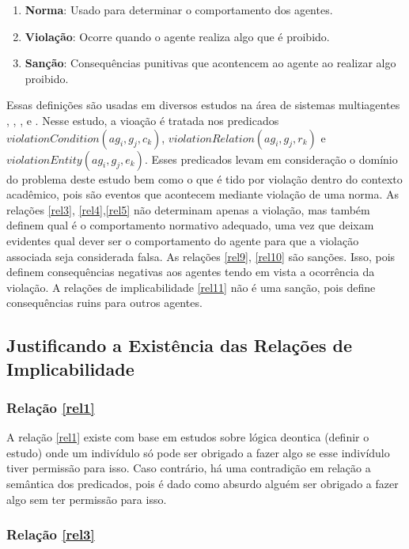 \documentclass[12pt]{article}
\begin{document}
\begin{enumerate}
	\item \textbf{Norma}: Usado para determinar o comportamento dos agentes.
	\item \textbf{Violação}: Ocorre quando o agente realiza algo que é proibido.
	\item \textbf{Sanção}: Consequências punitivas que acontencem ao agente ao realizar algo proibido.	
\end{enumerate}

Essas definições são usadas em diversos estudos na área de sistemas multiagentes \cite{dastaniNormativeMultiAgentProgram}, \cite{multiagentsystem}, \cite{violationcamille}, \cite{amodelmultiagentsystemdynamicrelationship} e \cite{ontologynormative}. Nesse estudo, a vioação é tratada nos predicados $violationCondition(ag_i,g_j,c_k)$, $violationRelation(ag_i,g_j,r_k)$ e $violationEntity(ag_i,g_j,e_k)$. Esses predicados levam em consideração o domínio do problema deste estudo bem como o que é tido por violação dentro do contexto acadêmico, pois são eventos que acontecem mediante violação de uma norma. As relações \ref{rel3}, \ref{rel4},\ref{rel5} não determinam apenas a violação, mas também definem qual é o comportamento normativo adequado, uma vez que deixam evidentes qual dever ser o comportamento do agente para que a violação associada seja considerada falsa. As relações \ref{rel9}, \ref{rel10} são sanções. Isso, pois definem consequências negativas aos agentes tendo em vista a ocorrência da violação. A relações de implicabilidade \ref{rel11} não é uma sanção, pois define consequências ruins para outros agentes. 


\subsection{Justificando a Existência das Relações de Implicabilidade}


\subsubsection{Relação \ref{rel1}}
A relação \ref{rel1} existe com base em estudos sobre lógica deontica (definir o estudo) onde um indivídulo só pode ser obrigado a fazer algo se esse indivídulo tiver permissão para isso. Caso contrário, há uma contradição em relação a semântica dos predicados, pois é dado como absurdo alguém ser obrigado a fazer algo sem ter permissão para isso. 


\subsubsection{Relação \ref{rel3}}
\end{document}
